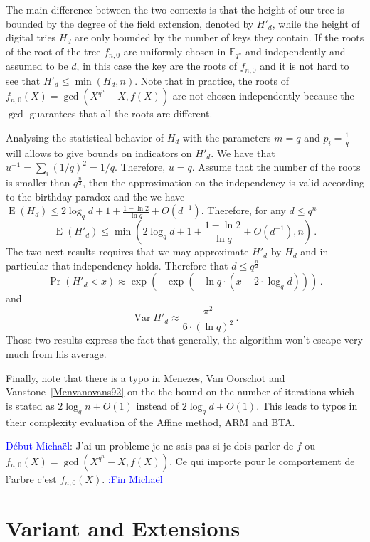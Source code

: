 \documentclass{sig-alternate}
\newcommand{\ff}[1]{\mathbb{F}_{#1}}
\newcommand{\dd}{d}
\newcommand{\qq}{q}
\newcommand{\nn}{n}
\newcommand{\qn}{{\qq^\nn}}
\newcommand{\extf}{\ff{\qn}}
\DeclareMathOperator{\Var}{Var}
\DeclareMathOperator{\Exp}{E}
\newcommand{\bigO}{O}
\newcounter{algo}
\newcommand{\comd}{\noindent \textcolor{blue}{D\'ebut Micha\"el}:}
\newcommand{\comf}{\noindent \textcolor{blue}{:Fin Micha\"el}}
\begin{document}
 The main difference between the two contexts is that the height of our tree is bounded by the degree of the field extension, denoted by $H'_\dd$, while the height of digital tries $H_\dd$ are only bounded by the number of keys they contain. If the roots of the root of the tree $f_{n,0}$ are uniformly chosen in $\extf$ and independently and assumed to be $\dd$, in this case the key are the roots of $f_{n,0}$ and it is not hard to see that $H'_\dd \le \min(H_\dd,\nn)$. 
 Note that in practice, the roots of $f_{n,0}(X)=\gcd(X^{\qq^\nn} -X,f(X))$ are not chosen independently because the $\gcd$ guarantees that all the roots are different.

Analysing the statistical behavior of $H_\dd$ with the parameters $m=\qq$ and $p_i=\frac{1}{\qq}$ will allows to give bounds on indicators on  $H'_\dd$. We have that $u^{-1}=\sum_i (1/\qq)^2=1/\qq$. Therefore, $u=\qq$.
Assume that  the number of the roots is smaller than $\qq^{\frac{\nn}{2}}$, then the approximation on the independency is valid according to the birthday paradox and the we have $\Exp(H_\dd) \le 2 \log_\qq \dd +1 +\frac{1-\ln 2}{\ln \qq} + \bigO(\dd^{-1})$. Therefore, for any $\dd \le \qq^\nn$
$$\Exp(H' _\dd) \le  \min(2 \log_\qq \dd +1 +\frac{1-\ln 2}{\ln \qq} + \bigO(\dd^{-1}), \nn)\,.$$
The two next results requires that we may approximate $H'_\dd$ by $H_\dd$ and in particular that independency holds. Therefore that $\dd \le \qq^{\frac{\nn}{2}}$
$$\Pr(H'_\dd <x) \approx \exp(-\exp(-\ln \qq \cdot (x-2 \cdot \log_\qq \dd)))\,.$$
and 
$$\Var H'_\dd \approx \frac{\pi^2}{6 \cdot (\ln \qq)^2}\,.$$
Those two results express the fact that generally, the algorithm won't escape very much from his average.


Finally, note that there is a typo in Menezes, Van Oorschot and Vanstone~\ref{Menvanovans92} on the the bound on the number of iterations which is stated as $ 2\log_q \nn + \bigO(1)$  instead of $2\log_q \dd + \bigO(1)$. This leads to typos in their complexity evaluation of the Affine method, ARM and BTA.


\comd
J'ai un probleme je ne sais pas si je dois parler de $f$ ou $f_{n,0}(X)=\gcd(X^{\qq^\nn} -X,f(X))$. Ce qui importe pour le comportement de l'arbre c'est $f_{n,0}(X)$.
\comf 









\section{Variant and Extensions}
\end{document}
